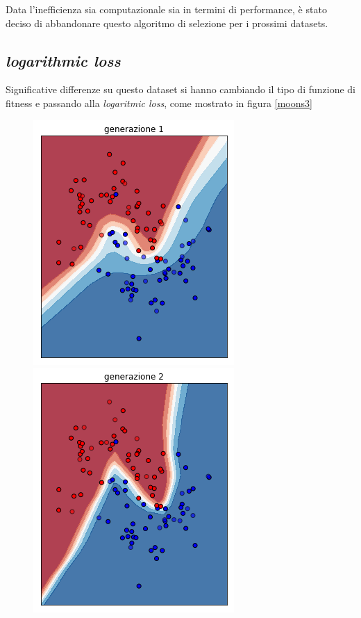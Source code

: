 \documentclass[12pt,a4paper]{report}
\begin{document}
Data l'inefficienza sia computazionale sia in termini di performance, è stato deciso di abbandonare questo algoritmo di selezione per i prossimi datasets.

\subsection{\textit{logarithmic loss}}

Significative differenze su questo dataset si hanno cambiando il tipo di funzione di fitness e passando alla \textit{logaritmic loss}, come mostrato in figura \ref{moons3}

\begin{figure}[H]
 \centering
 \includegraphics[scale = 0.3]{images/moons-rnd-log./1}
 \includegraphics[scale = 0.3]{images/moons-rnd-log./2}

\end{figure}
\end{document}
